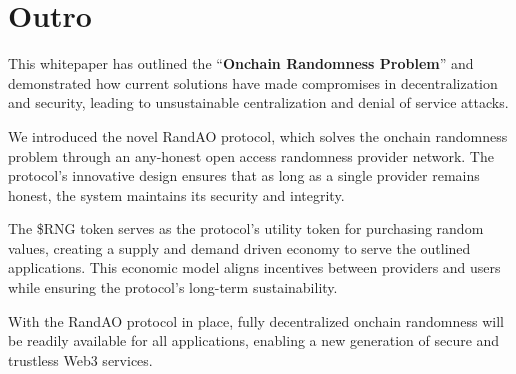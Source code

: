 \section{Outro}\label{sec:outro}

This whitepaper has outlined the ``\textbf{Onchain Randomness Problem}'' and demonstrated how current solutions have made compromises in decentralization and security, leading to unsustainable centralization and denial of service attacks. 

We introduced the novel RandAO protocol, which solves the onchain randomness problem through an any-honest open access randomness provider network. The protocol's innovative design ensures that as long as a single provider remains honest, the system maintains its security and integrity.

The \$RNG token serves as the protocol's utility token for purchasing random values, creating a supply and demand driven economy to serve the outlined applications. This economic model aligns incentives between providers and users while ensuring the protocol's long-term sustainability.

With the RandAO protocol in place, fully decentralized onchain randomness will be readily available for all applications, enabling a new generation of secure and trustless Web3 services.
